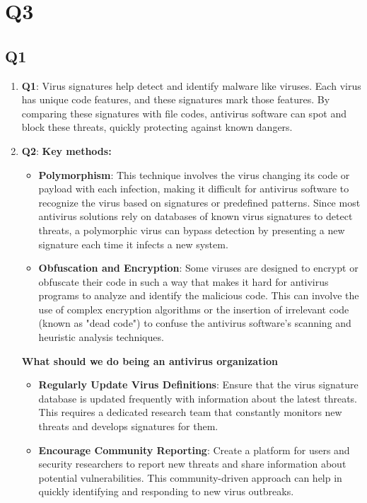 \documentclass{article}
\begin{document}
\section{Q3}

\subsection{Q1}
	\begin{enumerate}
		\item \textbf{Q1}:
		Virus signatures help detect and identify malware like viruses\cite{Lenovo2023VirusSignature}. Each virus has unique code features, and these signatures mark those features. By comparing these signatures with file codes, antivirus software can spot and block these threats, quickly protecting against known dangers.

		\item \textbf{Q2}:
		\textbf{Key methods:}
			\begin{itemize}
				\item \textbf{Polymorphism}: This technique involves the virus changing its code or payload with each infection, making it difficult for antivirus software to recognize the virus based on signatures or predefined patterns. Since most antivirus solutions rely on databases of known virus signatures to detect threats, a polymorphic virus can bypass detection by presenting a new signature each time it infects a new system.

				\item \textbf{Obfuscation and Encryption}: Some viruses are designed to encrypt or obfuscate their code in such a way that makes it hard for antivirus programs to analyze and identify the malicious code. This can involve the use of complex encryption algorithms or the insertion of irrelevant code (known as "dead code") to confuse the antivirus software's scanning and heuristic analysis techniques.
			\end{itemize}

		\textbf{What should we do being an antivirus organization}
			\begin{itemize}
				\item \textbf{Regularly Update Virus Definitions}: Ensure that the virus signature database is updated frequently with information about the latest threats. This requires a dedicated research team that constantly monitors new threats and develops signatures for them.

				\item \textbf{Encourage Community Reporting}: Create a platform for users and security researchers to report new threats and share information about potential vulnerabilities. This community-driven approach can help in quickly identifying and responding to new virus outbreaks.
			\end{itemize}
	\end{enumerate}
\end{document}
